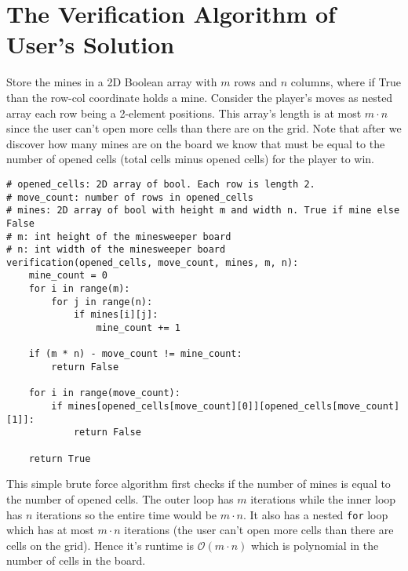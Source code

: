 \documentclass[11pt]{article}
\begin{document}
\section*{The Verification Algorithm of User's Solution}
\label{sec:org198d9c1}
Store the mines in a 2D Boolean array with \(m\) rows and \(n\) columns, where if True than the row-col coordinate holds a mine. Consider the player's moves as nested array each row being a 2-element positions. This array's length is at most \(m \cdot n\) since the user can't open more cells than there are on the grid. Note that after we discover how many mines are on the board we know that must be equal to the number of opened cells (total cells minus opened cells) for the player to win.
\begin{verbatim}
# opened_cells: 2D array of bool. Each row is length 2.
# move_count: number of rows in opened_cells
# mines: 2D array of bool with height m and width n. True if mine else False
# m: int height of the minesweeper board
# n: int width of the minesweeper board
verification(opened_cells, move_count, mines, m, n):
    mine_count = 0
    for i in range(m):
        for j in range(n):
            if mines[i][j]:
                mine_count += 1

    if (m * n) - move_count != mine_count:
        return False

    for i in range(move_count):
        if mines[opened_cells[move_count][0]][opened_cells[move_count][1]]:
            return False

    return True
\end{verbatim}
This simple brute force algorithm first checks if the number of mines is equal to the number of opened cells. The outer loop has \(m\) iterations while the inner loop has \(n\) iterations so the entire time would be \(m \cdot n\). It also has a nested \texttt{for} loop which has at most \(m \cdot n\) iterations (the user can't open more cells than there are cells on the grid). Hence it's runtime is \(\mathcal{O}(m \cdot n)\) which is polynomial in the number of cells in the board.
\end{document}
